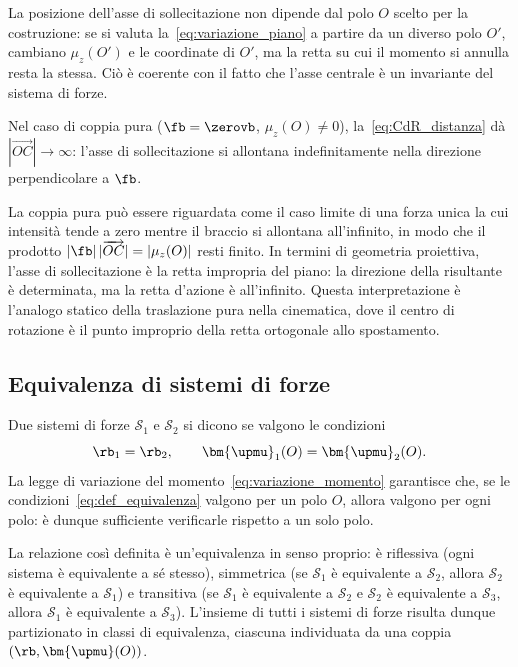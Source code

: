 \begin{oss}
	La posizione dell'asse di sollecitazione non dipende dal
	polo $O$ scelto per la costruzione: se si valuta
	la~\eqref{eq:variazione_piano} a partire da un diverso
	polo $O'$, cambiano $\mu_z(O')$ e le coordinate di $O'$,
	ma la retta su cui il momento si annulla resta la stessa.
	Ciò è coerente con il fatto che l'asse centrale è un
	invariante del sistema di forze.
\end{oss}

Nel caso di coppia pura ($\fb = \zerovb$,
$\mu_z(O) \neq 0$), la~\eqref{eq:CdR_distanza} dà
$|\overrightarrow{OC}| \to \infty$: l'asse di sollecitazione
si allontana indefinitamente nella direzione perpendicolare a
$\fb$.

\begin{oss}
	La coppia pura può essere riguardata come il caso limite
	di una forza unica la cui intensità tende a zero mentre
	il braccio si allontana all'infinito, in modo che il
	prodotto $|\fb|\,|\overrightarrow{OC}| = |\mu_z(O)|$
	resti finito. In termini di geometria proiettiva, l'asse
	di sollecitazione è la retta impropria del piano: la
	direzione della risultante è determinata, ma la retta
	d'azione è all'infinito. Questa interpretazione è
	l'analogo statico della traslazione pura nella cinematica,
	dove il centro di rotazione è il punto improprio della
	retta ortogonale allo spostamento.
\end{oss}


\subsection{Equivalenza di sistemi di forze}\label{sec:equivalenza}

Due sistemi di forze $\mathcal{S}_1$ e $\mathcal{S}_2$ si
dicono 
 se valgono le condizioni
\begin{equation}\label{eq:def_equivalenza}
	\rb_{1} = \rb_{2}, \qquad
	\bm{\upmu}_{1}(O) = \bm{\upmu}_{2}(O).
\end{equation}
La legge di variazione del
momento~\eqref{eq:variazione_momento} garantisce che, se
le condizioni~\eqref{eq:def_equivalenza} valgono per un
polo $O$, allora valgono per ogni polo: è dunque
sufficiente verificarle rispetto a un solo polo.


\begin{oss}
	La relazione così definita è un'equivalenza in senso
	proprio: è riflessiva (ogni sistema è equivalente a sé
	stesso), simmetrica (se $\mathcal{S}_1$ è equivalente a
	$\mathcal{S}_2$, allora $\mathcal{S}_2$ è equivalente a
	$\mathcal{S}_1$) e transitiva (se $\mathcal{S}_1$ è
	equivalente a $\mathcal{S}_2$ e $\mathcal{S}_2$ è
	equivalente a $\mathcal{S}_3$, allora $\mathcal{S}_1$ è
	equivalente a $\mathcal{S}_3$). L'insieme di tutti i
	sistemi di forze risulta dunque partizionato in classi di
	equivalenza, ciascuna individuata da una coppia
	$(\rb, \bm{\upmu}(O))$.
\end{oss}

